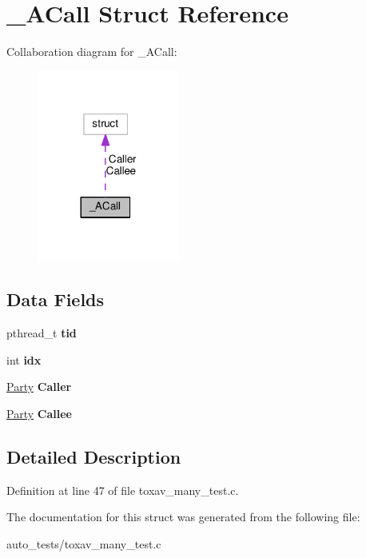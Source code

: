 \hypertarget{struct___a_call}{\section{\+\_\+\+A\+Call Struct Reference}
\label{struct___a_call}
}


Collaboration diagram for \+\_\+\+A\+Call\+:\nopagebreak
\begin{figure}[H]
\begin{center}
\leavevmode
\includegraphics[width=132pt]{struct___a_call__coll__graph}
\end{center}
\end{figure}
\subsection*{Data Fields}
\begin{DoxyCompactItemize}
\item 
\hypertarget{struct___a_call_a3a5ba243b3ab4b6093afb178de0f9509}{pthread\+\_\+t {\bfseries tid}}\label{struct___a_call_a3a5ba243b3ab4b6093afb178de0f9509}

\item 
\hypertarget{struct___a_call_ae40354a1051342eb5a9db005715dcfa9}{int {\bfseries idx}}\label{struct___a_call_ae40354a1051342eb5a9db005715dcfa9}

\item 
\hypertarget{struct___a_call_a51f82344f432ea82fc1a993d1f9cb018}{\hyperlink{struct___party}{Party} {\bfseries Caller}}\label{struct___a_call_a51f82344f432ea82fc1a993d1f9cb018}

\item 
\hypertarget{struct___a_call_ac9f376aa53c5e8c50a3ebd11c377f0dd}{\hyperlink{struct___party}{Party} {\bfseries Callee}}\label{struct___a_call_ac9f376aa53c5e8c50a3ebd11c377f0dd}

\end{DoxyCompactItemize}


\subsection{Detailed Description}


Definition at line 47 of file toxav\+\_\+many\+\_\+test.\+c.



The documentation for this struct was generated from the following file\+:\begin{DoxyCompactItemize}
\item 
auto\+\_\+tests/toxav\+\_\+many\+\_\+test.\+c\end{DoxyCompactItemize}
